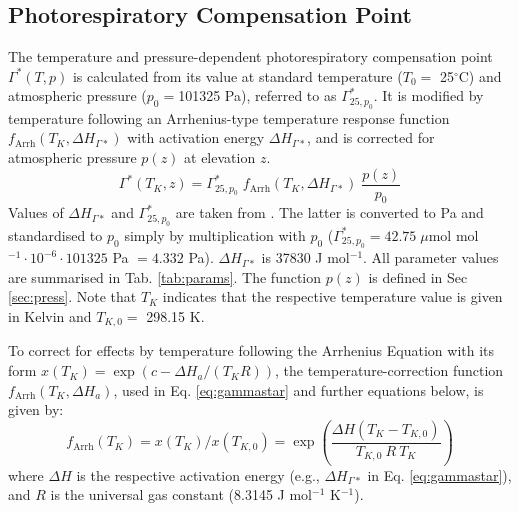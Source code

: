 \documentclass{myreport}
\begin{document}
\subsection{Photorespiratory Compensation Point}
\label{sec:gs}
The temperature and pressure-dependent photorespiratory compensation point $\Gamma^\ast(T,p)$ is calculated from its value at standard temperature ($T_0=$ 25${^\circ}$C) and atmospheric pressure ($p_0 = $101325 Pa), referred to as $\Gamma^\ast_{25, p_0}$. It is modified by temperature following an Arrhenius-type temperature response function $f_{\text{Arrh}}(T_K, \Delta H_{\Gamma\ast})$ with activation energy $\Delta H_{\Gamma\ast}$, and is corrected for atmospheric pressure $p(z)$ at elevation $z$. 
\begin{equation}
\label{eq:gammastar}
    \Gamma^\ast (T_K, z) = \Gamma^\ast_{25, p_0} \; f_{\text{Arrh}}(T_K, \Delta H_{\Gamma\ast}) \; \frac{p(z)}{p_0}
\end{equation}
Values of $\Delta H_{\Gamma\ast}$ and $\Gamma^\ast_{25, p_0}$ are taken from \cite{bernacchi01}. The latter is converted to Pa and standardised to $p_0$ simply by multiplication with $p_0$ ($\Gamma^\ast_{25, p_0} = 42.75\; \mu$mol mol$^{-1} \cdot 10^{-6} \cdot 101325$ Pa $ = 4.332$ Pa). $\Delta H_{\Gamma\ast}$ is 37830 J mol$^{-1}$. All parameter values are summarised in Tab. \ref{tab:params}. The function $p(z)$ is defined in Sec \ref{sec:press}. Note that $T_K$ indicates that the respective temperature value is given in Kelvin and $T_{K,0}=$ 298.15 K.

To correct for effects by temperature following the Arrhenius Equation with its form $x(T_K)=\exp(c-\Delta H_a/(T_K R))$, the temperature-correction function $f_{\text{Arrh}}(T_K, \Delta H_a)$, used in Eq. \ref{eq:gammastar} and further equations below, is given by:
\begin{equation}
    f_{\text{Arrh}}(T_K) = x(T_K)/x(T_{K,0}) = \exp \left( \frac{\Delta H (T_K - T_{K,0})}{T_{K,0}\: R\: T_K} \right) 
\end{equation}
where $\Delta H$ is the respective activation energy (e.g., $\Delta H_{\Gamma\ast}$ in Eq. \ref{eq:gammastar}), and $R$ is the universal gas constant (8.3145 J mol$^{-1}$ K$^{-1}$).
\end{document}
